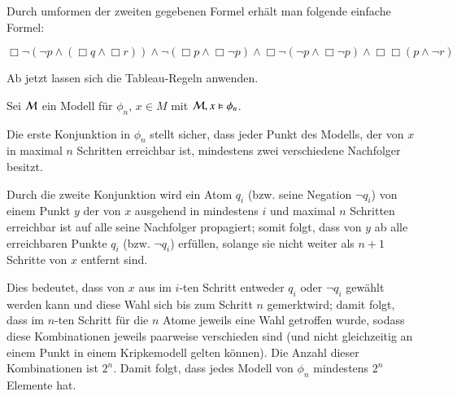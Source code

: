Durch umformen der zweiten gegebenen Formel erhält man folgende einfache Formel:

\begin{center}
	$ \Box \neg(\neg p \wedge (\Box q \wedge \Box r)) \wedge \neg (\Box p \wedge
	\Box\neg p) \wedge \Box \neg (\neg p \wedge \Box\neg p) \wedge \Box\Box(p
	\wedge \neg r)$
\end{center}

Ab jetzt lassen sich die Tableau-Regeln anwenden.





Sei $\mathcal{M}$ ein Modell für $\phi_n$, $x\in M$ mit $\mathcal{M}, x \vDash
\phi_n$.

Die erste Konjunktion in $\phi_n$ stellt sicher, dass jeder Punkt des
Modells, der von $x$ in maximal $n$ Schritten erreichbar ist, mindestens zwei
verschiedene Nachfolger besitzt.

Durch die zweite Konjunktion wird ein Atom $q_i$ (bzw. seine Negation $\neg q_i$)
von einem Punkt $y$ der von $x$ ausgehend in mindestens $i$ und maximal $n$
Schritten erreichbar ist auf alle seine Nachfolger propagiert; somit folgt,
dass von $y$ ab alle erreichbaren Punkte $q_i$ (bzw. $\neg q_i$) erfüllen,
solange sie nicht weiter als $n+1$ Schritte von $x$ entfernt sind.

Dies bedeutet, dass von $x$ aus im $i$-ten Schritt entweder $q_i$ oder $\neg
q_i$ gewählt werden kann und diese Wahl sich bis zum Schritt $n$ \glqq
gemerkt\grqq wird; damit folgt, dass im $n$-ten Schritt für die $n$ Atome
jeweils eine Wahl getroffen wurde, sodass diese Kombinationen jeweils paarweise
verschieden sind (und nicht gleichzeitig an einem Punkt in einem Kripkemodell
gelten können). Die Anzahl dieser Kombinationen ist $2^n$. Damit folgt, dass
jedes Modell von $\phi_n$ mindestens $2^n$ Elemente hat.

